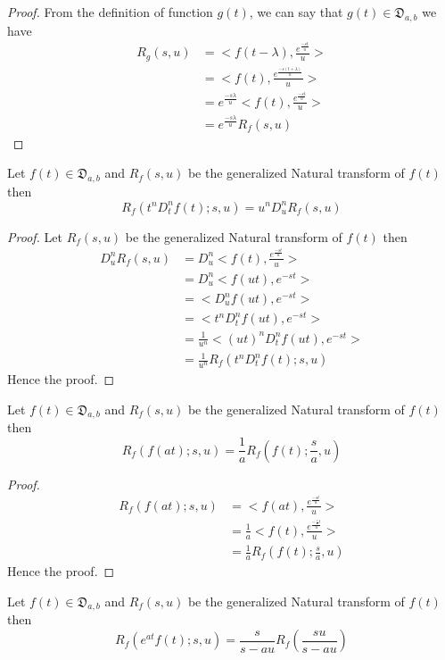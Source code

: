 \begin{proof}
From the definition of function $g(t)$, we can say that \hspace{0.5cm}$g(t)\in \mathfrak{D}_{a,b}$ we have
\begin{align*}
  R_{g}(s,u)&=<f(t-\lambda),\frac{e^{\frac{-st}{u}}}{u}>\\
  &=<f(t),\frac{e^{\frac{-s(t+\lambda)}{u}}}{u}>\\
  &=e^{\frac{-s\lambda}{u}}<f(t),\frac{e^{\frac{-st}{u}}}{u}>\\
  &=e^{\frac{-s\lambda}{u}}R_{f}(s,u)
 \end{align*}
\end{proof}
\begin{theorem}
 Let $f(t)\in \mathfrak{D}_{a,b}$ and $R_{f}(s,u)$ be the generalized Natural transform of $f(t)$
 then 
 \begin{equation*}
 R_{f}(t^{n}D_{t}^{n}f(t);s,u)=u^{n}D_{u}^{n}R_{f}(s,u)
 \end{equation*}
\end{theorem}

\begin{proof}
Let $R_{f}(s,u)$ be the generalized Natural transform of $f(t)$ then
\begin{align*}
D_{u}^{n}R_{f}(s,u)&=D_{u}^{n}<f(t),\frac{e^{\frac{-st}{u}}}{u}>\\
&=D_{u}^{n}<f(ut),e^{-st}>\\
&=<D_{u}^{n}f(ut),e^{-st}>\\
&=<t^{n}D_{t}^{n}f(ut),e^{-st}>\\
&=\frac{1}{u^{n}}<(ut)^{n}D_{t}^{n}f(ut),e^{-st}>\\
&=\frac{1}{u^{n}}R_{f}(t^{n}D_{t}^{n}f(t);s,u)
\end{align*}
Hence the proof.
\end{proof}
\begin{theorem}
 Let $f(t)\in \mathfrak{D}_{a,b}$ and $R_{f}(s,u)$ be the generalized Natural transform of $f(t)$
 then 
 \begin{equation*}
 R_{f}(f(at);s,u)=\frac{1}{a}R_{f}(f(t);\frac{s}{a},u)
 \end{equation*}
\end{theorem}
\begin{proof}
\begin{align*}
R_{f}(f(at);s,u)&=<f(at),\frac{e^{\frac{-st}{u}}}{u}>\\
&=\frac{1}{a}<f(t),\frac{e^{\frac{-\frac{s}{a}t}{u}}}{u}>\\
&=\frac{1}{a}R_{f}(f(t);\frac{s}{a},u)
\end{align*}
Hence the proof.
\end{proof}
\begin{theorem}
 Let $f(t)\in \mathfrak{D}_{a,b}$ and $R_{f}(s,u)$ be the generalized Natural transform of $f(t)$ 
 then 
 \begin{equation*}
 R_{f}(e^{at}f(t);s,u)=\frac{s}{s-au}R_{f}(\frac{su}{s-au})
 \end{equation*}
\end{theorem}

